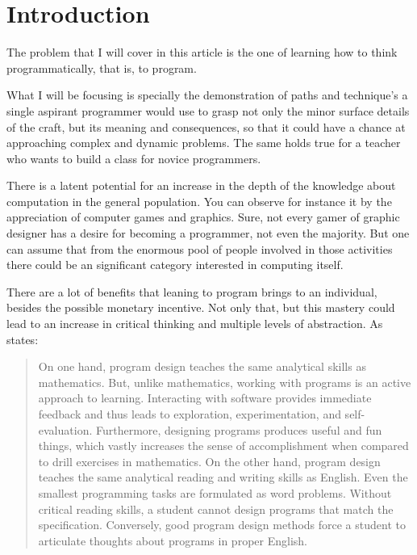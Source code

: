 \section{Introduction}
The problem that I will cover in this article is the one of learning how to
think programmatically, that is, to program.

What I will be focusing is specially the demonstration of paths and technique's
a single aspirant programmer would use to grasp not only the minor surface
details of the craft, but its meaning and consequences, so that it could have a
chance at approaching complex and dynamic problems. The same holds true for a
teacher who wants to build a class for novice programmers.

There is a latent potential for an increase in the depth of the knowledge about
computation in the general population. You can observe for instance it by the
appreciation of computer games and graphics. Sure, not every gamer of graphic
designer has a desire for becoming a programmer, not even the majority. But one
can assume that from the enormous pool of people involved in those activities
there could be an significant category interested in computing itself.

There are a lot of benefits that leaning to program brings to an individual,
besides the possible monetary incentive. \cite{education:sussman__why_programming_is_a_good_medium}
Not only that, but this mastery could lead to an increase in critical thinking
and multiple levels of abstraction. As \cite{education:felleisen__htdp} states:

\begin{quotation}
    On one hand, program design teaches the same analytical skills as mathematics.
    But, unlike mathematics, working with programs is an active approach to
    learning. Interacting with software provides immediate feedback and thus leads
    to exploration, experimentation, and self-evaluation. Furthermore, designing
    programs produces useful and fun things, which vastly increases the sense of
    accomplishment when compared to drill exercises in mathematics. On the other
    hand, program design teaches the same analytical reading and writing skills as
    English. Even the smallest programming tasks are formulated as word problems.
    Without critical reading skills, a student cannot design programs that match the
    specification. Conversely, good program design methods force a student to
    articulate thoughts about programs in proper English.
\end{quotation}

